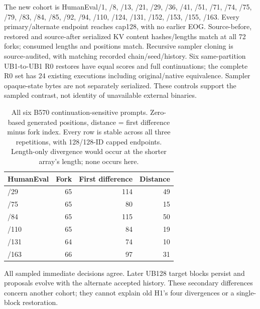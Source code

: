 The new cohort is HumanEval/1, /8, /13, /21, /29, /36, /41, /51, /71, /74, /75, /79, /83, /84, /85, /92, /94, /110, /124, /131, /152, /153, /155, /163. Every primary/alternate endpoint reaches cap128, with no earlier EOG. Source-before, restored and source-after serialized KV content hashes/lengths match at all 72 forks; consumed lengths and positions match. Recursive sampler cloning is source-audited, with matching recorded chain/seed/history. Six same-partition UB1-to-UB1 R0 restores have equal scores and full continuations; the complete R0 set has 24 existing executions including original/native equivalence. Sampler opaque-state bytes are not separately serialized. These controls support the sampled contrast, not identity of unavailable external binaries.

\begin{table}[t]
\caption{All six B570 continuation-sensitive prompts. Zero-based generated positions, distance = first difference minus fork index. Every row is stable across all three repetitions, with 128/128-ID capped endpoints. Length-only divergence would occur at the shorter array's length; none occurs here.}
\label{tab:forkpositions}
\centering
\begin{tabular}{lrrr}
\toprule
HumanEval & Fork & First difference & Distance \\
\midrule
/29 & 65 & 114 & 49 \\
/75 & 65 & 80 & 15 \\
/84 & 65 & 115 & 50 \\
/110 & 65 & 84 & 19 \\
/131 & 64 & 74 & 10 \\
/163 & 66 & 97 & 31 \\
\bottomrule
\end{tabular}
\end{table}
All sampled immediate decisions agree. Later UB128 target blocks persist and proposals evolve with the alternate accepted history. These secondary differences concern another cohort; they cannot explain old H1's four divergences or a single-block restoration.

